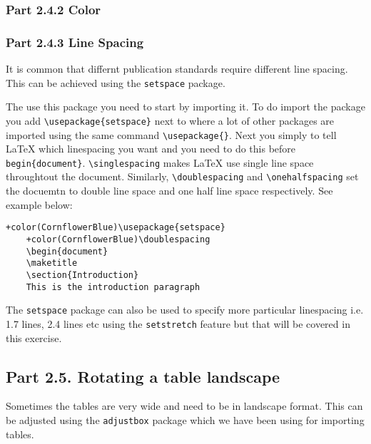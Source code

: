 \documentclass[12pts]{report}
\begin{document}
\subsubsection*{Part 2.4.2 Color}

\subsubsection*{Part 2.4.3 Line Spacing}
It is common that differnt publication standards require different line spacing. This can be achieved using the \texttt{setspace} package. 

The use this package you need to start by importing it. To do import the package you add \verb|\usepackage{setspace}| next to where a lot of other packages are imported using the same command \verb|\usepackage{}|. Next you simply to tell {\LaTeX} which linespacing you want and you need to do this before \verb|begin{document}|. \verb|\singlespacing| makes {\LaTeX} use single line space throughtout the document. Similarly, \verb|\doublespacing| and \verb|\onehalfspacing| set the docuemtn to double line space and one half line space respectively. See example below:

\begin{Verbatim}[commandchars=+\(\)]
	+color(CornflowerBlue)\usepackage{setspace}
	+color(CornflowerBlue)\doublespacing
	\begin{document}
	\maketitle
	\section{Introduction}
	This is the introduction paragraph
\end{Verbatim}

The \texttt{setspace} package can also be used to specify more particular linespacing i.e. 1.7 lines, 2.4 lines etc using the \texttt{setstretch} feature but that will be covered in this exercise.

\subsection*{Part 2.5. Rotating a table landscape}

Sometimes the tables are very wide and need to be in landscape format. This can be adjusted using the \texttt{adjustbox} package which we have been using for importing tables. 
\end{document}
